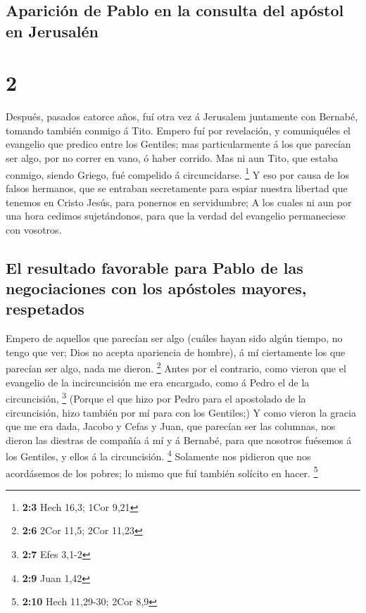 \hypertarget{apariciuxf3n-de-pablo-en-la-consulta-del-apuxf3stol-en-jerusaluxe9n}{%
\subsection{Aparición de Pablo en la consulta del apóstol en
Jerusalén}\label{apariciuxf3n-de-pablo-en-la-consulta-del-apuxf3stol-en-jerusaluxe9n}}

\hypertarget{section-1}{%
\section{2}\label{section-1}}

 Después, pasados catorce años, fuí otra vez á Jerusalem
juntamente con Bernabé, tomando también conmigo á Tito. 
Empero fuí por revelación, y comuniquéles el evangelio que predico entre
los Gentiles; mas particularmente á los que parecían ser algo, por no
correr en vano, ó haber corrido.  Mas ni aun Tito, que
estaba conmigo, siendo Griego, fué compelido á circuncidarse.
\footnote{\textbf{2:3} Hech 16,3; 1Cor 9,21}  Y eso por
causa de los falsos hermanos, que se entraban secretamente para espiar
nuestra libertad que tenemos en Cristo Jesús, para ponernos en
servidumbre;  A los cuales ni aun por una hora cedimos
sujetándonos, para que la verdad del evangelio permaneciese con
vosotros.

\hypertarget{el-resultado-favorable-para-pablo-de-las-negociaciones-con-los-apuxf3stoles-mayores-respetados}{%
\subsection{El resultado favorable para Pablo de las negociaciones con
los apóstoles mayores,
respetados}\label{el-resultado-favorable-para-pablo-de-las-negociaciones-con-los-apuxf3stoles-mayores-respetados}}

 Empero de aquellos que parecían ser algo (cuáles hayan
sido algún tiempo, no tengo que ver; Dios no acepta apariencia de
hombre), á mí ciertamente los que parecían ser algo, nada me dieron.
\footnote{\textbf{2:6} 2Cor 11,5; 2Cor 11,23}  Antes por
el contrario, como vieron que el evangelio de la incircuncisión me era
encargado, como á Pedro el de la circuncisión, \footnote{\textbf{2:7}
  Efes 3,1-2}  (Porque el que hizo por Pedro para el
apostolado de la circuncisión, hizo también por mí para con los
Gentiles;)  Y como vieron la gracia que me era dada,
Jacobo y Cefas y Juan, que parecían ser las columnas, nos dieron las
diestras de compañía á mí y á Bernabé, para que nosotros fuésemos á los
Gentiles, y ellos á la circuncisión. \footnote{\textbf{2:9} Juan 1,42}
 Solamente nos pidieron que nos acordásemos de los
pobres; lo mismo que fuí también solícito en hacer. \footnote{\textbf{2:10}
  Hech 11,29-30; 2Cor 8,9}

